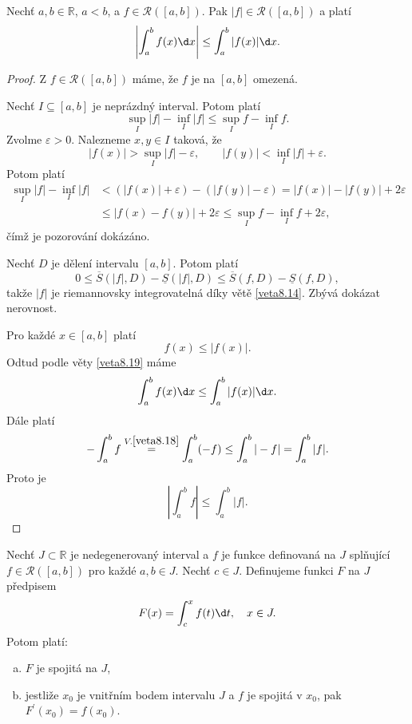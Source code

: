 \begin{veta}\label{veta8.21}
Nechť $a,b \in \mathbb{R}$, $a<b$, a $f \in \mathcal R([a,b])$. Pak $|f| \in \mathcal R([a,b])$ a platí
\[
\left| \int_a^b f(x)\d x \right| \le \int_a^b |f(x)|\d x.
\]
\end{veta}

\begin{proof}
	Z $f\in \mathcal R([a,b])$ máme, že $f$ je na $[a,b]$ omezená.
	\begin{pozorovani}
		Nechť $I \subseteq [a,b]$ je neprázdný interval. Potom platí
		$$
		    \sup_I |f| - \inf_I |f| \leq \sup_I f - \inf_I f.
		$$
		Zvolme  $\varepsilon > 0$. Nalezneme $x,y\in I$  taková, že
		$$
		    |f(x)|>\sup_I |f|-\varepsilon, \qquad |f(y)| < \inf_I |f| + \varepsilon.
		$$
		Potom platí
		\begin{align*}
		\sup_I |f| - \inf_I |f| & < (|f(x)| + \varepsilon) - (|f(y)|-\varepsilon) = |f(x)| - |f(y)|+2\varepsilon \\
		&\leq |f(x)-f(y)|+ 2\varepsilon  \leq \sup_I f - \inf_I f+ 2\varepsilon,
		\end{align*}
        čímž je pozorování dokázáno.
	\end{pozorovani}
	Nechť $ D$ je dělení intervalu $[a,b]$. Potom platí
	$$
	   0\leq \overline S(|f|, D) - \underline S(|f|,D)\leq \overline S (f, D) - \underline S(f, D),
	$$
	takže $|f|$ je riemannovsky integrovatelná díky větě \ref{veta8.14}. Zbývá dokázat nerovnost.
	\par Pro každé $x \in [a,b]$ platí
	$$
	    f(x)\leq |f(x)|.
	$$
	Odtud podle věty \ref{veta8.19} máme
	$$
	    \int_a^b f(x) \d x \leq \int _a^b |f(x)|\d x.
	$$
	Dále platí
	$$
	    -\int _a^b f \stackrel{V. \ref{veta8.18}}{=} \int_a^b (-f) \leq \int_a^b |-f| = \int_a^b |f|.
	$$
	Proto je
	$$
	    \left | \int_a^b f \right|\leq \int _a^b |f|.
	$$
\end{proof}

\begin{veta}\label{veta8.22}
Nechť $J \subset \mathbb{R}$ je nedegenerovaný interval a $f$ je funkce definovaná na $J$ splňující
$f \in \mathcal R([a,b])$ pro každé $a,b \in J$. Nechť $c \in J$. Definujeme funkci $F$ na $J$ předpisem
\[
F(x) = \int_c^x f(t)\d t, \quad x \in J.
\]
Potom platí:
\begin{enumerate}[(a)]
	\item $F$ je spojitá na $J$,
	\item jestliže $x_0$ je vnitřním bodem intervalu $J$ a $f$ je spojitá v $x_0$, pak $F^\prime(x_0) = f(x_0)$.
\end{enumerate}
\end{veta}

